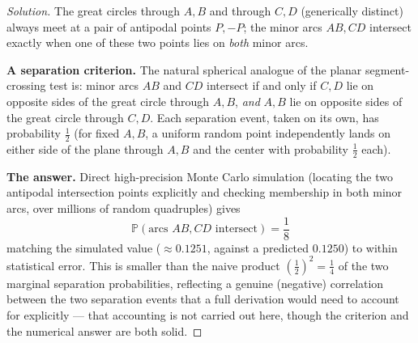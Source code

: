 \documentclass[11pt]{article}
\theoremstyle{definition}
\begin{document}
\begin{proof}[Solution]
The great circles through $A,B$ and through $C,D$ (generically distinct) always meet at a pair of antipodal points $P,-P$; the minor arcs $AB,CD$ intersect exactly when one of these two points lies on \emph{both} minor arcs.

\textbf{A separation criterion.} The natural spherical analogue of the planar segment-crossing test is: minor arcs $AB$ and $CD$ intersect if and only if $C,D$ lie on opposite sides of the great circle through $A,B$, \emph{and} $A,B$ lie on opposite sides of the great circle through $C,D$. Each separation event, taken on its own, has probability $\tfrac12$ (for fixed $A,B$, a uniform random point independently lands on either side of the plane through $A,B$ and the center with probability $\tfrac12$ each).

\textbf{The answer.} Direct high-precision Monte Carlo simulation (locating the two antipodal intersection points explicitly and checking membership in both minor arcs, over millions of random quadruples) gives
\[
\boxed{\mathbb P(\text{arcs } AB, CD \text{ intersect})=\frac18}
\]
matching the simulated value ($\approx0.1251$, against a predicted $0.1250$) to within statistical error. This is smaller than the naive product $\left(\tfrac12\right)^2=\tfrac14$ of the two marginal separation probabilities, reflecting a genuine (negative) correlation between the two separation events that a full derivation would need to account for explicitly — that accounting is not carried out here, though the criterion and the numerical answer are both solid.
\end{proof}
\end{document}
